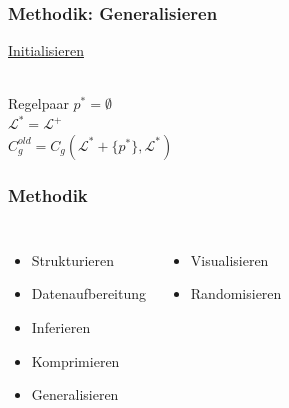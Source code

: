 \documentclass[12pt]{beamer}
\begin{document}
    \begin{frame}[allowframebreaks]
        \frametitle{Methodik: Generalisieren}

        \underline{Initialisieren}\\
        ~\\
        \begin{algorithm}[H]
            Regelpaar $p^* = \emptyset$\\
            $\mathcal{L}^* = \mathcal{L}^+$\\
            $C_g^{old} = C_g(\mathcal{L}^* + \{p^*\}, \mathcal{L}^*)$
        \end{algorithm}

        \framebreak

        \begin{algorithm}[H]
        \end{algorithm}
    \end{frame}

    \begin{frame}
        \frametitle{Methodik}

        \begin{columns}
            \begin{itemize}
                \setlength\itemsep{1em}
                \item<1-> Strukturieren
                \item<1-> Datenaufbereitung
                \item<1-> Inferieren
                \item<1-> Komprimieren
                \item<1-> Generalisieren
            \end{itemize}
            \begin{itemize}
                \setlength\itemsep{1em}
                \item<2-> Visualisieren
                \item<3-> Randomisieren
            \end{itemize}
        \end{columns}
    \end{frame}
\end{document}

